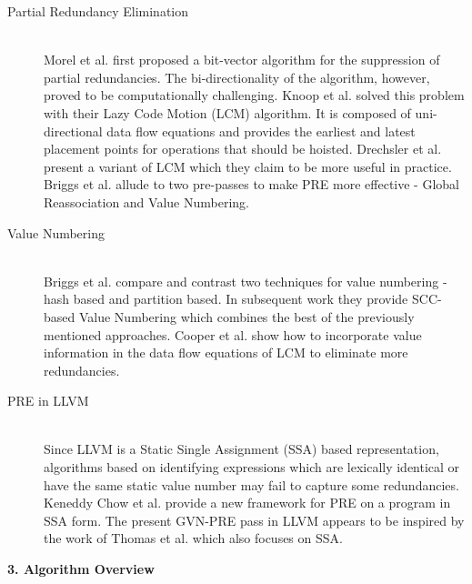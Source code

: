 \documentclass[10pt,twoside]{report}
\begin{document}
\begin{description}
\item [Partial Redundancy Elimination]    \hfill \\
Morel et al. \cite{Morel} first proposed a bit-vector algorithm for the
suppression of partial redundancies. The bi-directionality of the algorithm,
            however, proved to be computationally challenging. Knoop et al.
            \cite{Knoop} solved this problem with their Lazy Code Motion (LCM)
  algorithm. It is composed of uni-directional data flow equations and provides
  the earliest and latest placement points for operations that should be
  hoisted. Drechsler et al. \cite{Drechsler} present a variant of LCM which they claim to
  be more useful in practice. Briggs et al. \cite{Briggs2} allude to two
  pre-passes to make PRE more effective - Global Reassociation and Value
  Numbering.

\item [Value Numbering] \hfill \\
Briggs et al. \cite{Briggs} compare and contrast two techniques for
value numbering - hash based\cite{CS} and partition based\cite{AWZ}. In subsequent work they
provide SCC-based Value Numbering \cite{Cooper95scc-basedvalue}  which combines
the best of the previously mentioned approaches. Cooper et al.
\cite{CVDC} show how to incorporate value
information in the data flow equations of LCM to eliminate more redundancies.

\item [PRE in LLVM] \hfill \\
Since LLVM is a Static Single Assignment (SSA) based representation, algorithms
based on identifying expressions which are lexically identical or have the same
static value number may fail to capture some redundancies.
Keneddy Chow et al.
\cite{Kennedy99partialredundancy} provide a new framework for PRE on a program
in SSA form. The present GVN-PRE pass in LLVM appears to be inspired by the
work of Thomas et al. \cite{Vandrunen04value-basedpartial} which also focuses
on SSA.
\end{description}

\begin{flushleft}
\textbf{\Large{3. Algorithm Overview}}
\end{flushleft}
\end{document}
